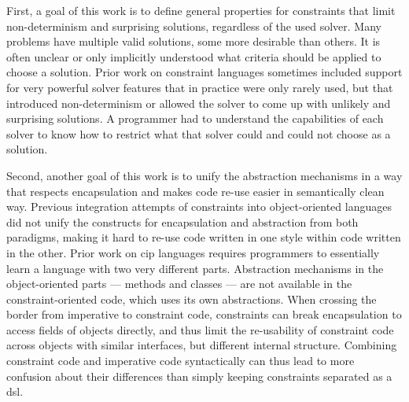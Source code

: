 \begin{sloppypar}
  First, a goal of this work is to define general properties for constraints
  that limit non-determinism and surprising solutions, regardless of the used
  solver. Many problems have multiple valid solutions, some more desirable than
  others. It is often unclear or only implicitly understood what criteria should
  be applied to choose a solution. Prior work on constraint languages sometimes
  included support for very powerful solver features that in practice were only
  rarely used, but that introduced non-determinism or allowed the solver to come
  up with unlikely and surprising solutions. A programmer had to understand the
  capabilities of each solver to know how to restrict what that solver could and
  could not choose as a solution.
\end{sloppypar}

Second, another goal of this work is to unify the abstraction mechanisms in a
way that respects encapsulation and makes code re-use easier in semantically
clean way. Previous integration attempts of constraints into object-oriented
languages did not unify the constructs for encapsulation and abstraction from
both paradigms, making it hard to re-use code written in one style within code
written in the other. Prior work on \ac{cip} languages requires programmers to
essentially learn a language with two very different parts. Abstraction
mechanisms in the object-oriented parts --- \ie methods and classes --- are not
available in the constraint-oriented code, which uses its own abstractions. When
crossing the border from imperative to constraint code, constraints can break
encapsulation to access fields of objects directly, and thus limit the
re-usability of constraint code across objects with similar interfaces, but
different internal structure. Combining constraint code and imperative code
syntactically can thus lead to more confusion about their differences than
simply keeping constraints separated as a \gls{dsl}.

